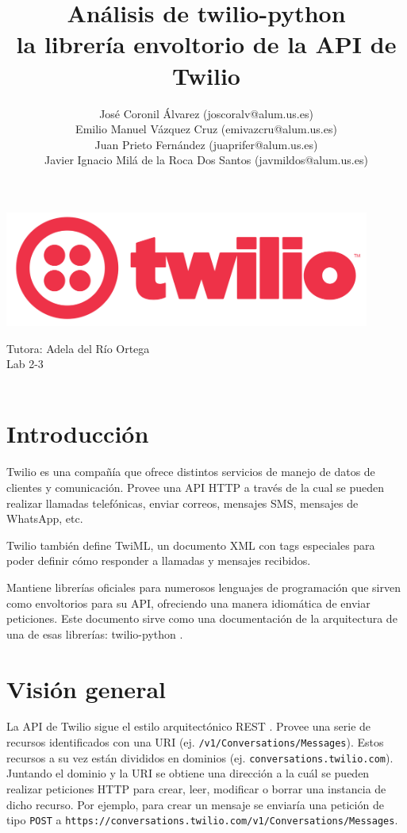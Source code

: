 \documentclass{article}
\title{%
  \Huge Análisis de twilio-python\\
  \LARGE la librería envoltorio de la API de Twilio
  }
\author{José Coronil Álvarez (joscoralv@alum.us.es) \\
Emilio Manuel Vázquez Cruz (emivazcru@alum.us.es) \\
Juan Prieto Fernández (juaprifer@alum.us.es) \\
Javier Ignacio Milá de la Roca Dos Santos (javmildos@alum.us.es) \\}
\date{}
\begin{document}
\begin{titlepage}
  \centering
  \hfill
  \vfil
  {\bfseries\Large
      \thetitle
  }    
  \vfill
  \includegraphics[width=12cm]{logo.png} %
  \vfill
  
  Tutora: Adela del Río Ortega \\
  Lab 2-3\\
  \hfill\\
  \theauthor
\end{titlepage}

\tableofcontents

\newpage

\section{Introducción}

Twilio es una compañía que ofrece distintos servicios
de manejo de datos de clientes y comunicación.
Provee una API HTTP a través de la cual se pueden realizar llamadas telefónicas,
enviar correos, mensajes SMS, mensajes de WhatsApp, etc.

Twilio también define TwiML,
un documento XML con tags especiales
para poder definir cómo responder a llamadas y mensajes recibidos.

Mantiene librerías oficiales para numerosos lenguajes de programación
que sirven como envoltorios para su API,
ofreciendo una manera idiomática de enviar peticiones.
Este documento sirve como una documentación de la arquitectura
de una de esas librerías: twilio-python \cite{twilio-python}.


\section{Visión general}

La API de Twilio sigue el estilo arquitectónico REST \cite{twilio-rest}.
Provee una serie de recursos identificados con una URI
(ej. \verb|/v1/Conversations/Messages|).
Estos recursos a su vez están divididos en dominios
(ej. \verb|conversations.twilio.com|).
Juntando el dominio y la URI se obtiene una dirección
a la cuál se pueden realizar peticiones HTTP
para crear, leer, modificar o borrar una instancia de dicho recurso.
Por ejemplo, para crear un mensaje se enviaría una petición
de tipo \verb|POST|
a \verb|https://conversations.twilio.com/v1/Conversations/Messages|.
\end{document}

